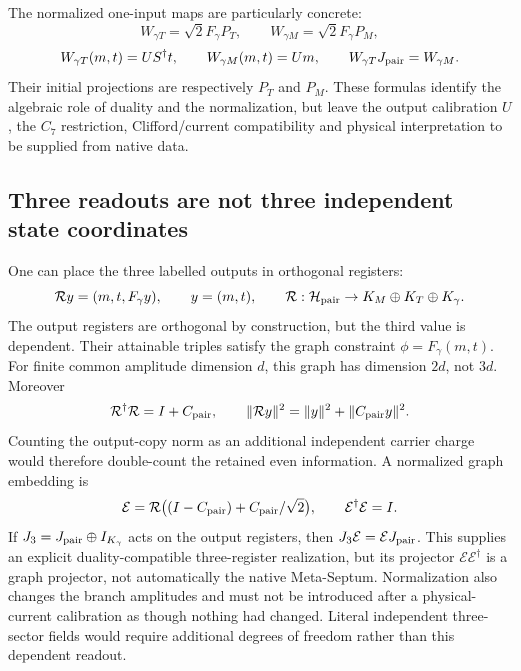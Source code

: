 \documentclass[11pt,a4paper]{article}
\begin{document}
The normalized one-input maps are particularly concrete:
\[
 W_{\gamma T}=\sqrt2 F_\gamma P_T,\qquad
 W_{\gamma M}=\sqrt2 F_\gamma P_M,
\]
\[
 W_{\gamma T}(m,t)=US^\dagger t,\qquad
 W_{\gamma M}(m,t)=Um,\qquad
 W_{\gamma T}J_{\rm pair}=W_{\gamma M}.
\]
Their initial projections are respectively $P_T$ and $P_M$.
These formulas identify the algebraic role of duality and the
normalization, but leave the output calibration $U$, the $C_7$
restriction, Clifford/current compatibility and physical interpretation
to be supplied from native data.

\subsection{Three readouts are not three independent state coordinates}

One can place the three labelled outputs in orthogonal registers:
\[
 \mathcal R y=(m,t,F_\gamma y),\qquad y=(m,t),\qquad
 \mathcal R:\mathcal H_{\rm pair}\to
 K_M\oplus K_T\oplus K_\gamma.
\]
The output registers are orthogonal by construction, but the third
value is dependent. Their attainable triples satisfy the graph
constraint $\phi=F_\gamma(m,t)$. For finite common amplitude
dimension $d$, this graph has dimension $2d$, not $3d$.
Moreover
\[
 \mathcal R^\dagger\mathcal R=I+C_{\rm pair},\qquad
 \|\mathcal R y\|^2=\|y\|^2+\|C_{\rm pair}y\|^2.
\]
Counting the output-copy norm as an additional independent carrier
charge would therefore double-count the retained even information.
A normalized graph embedding is
\[
 \mathcal E=\mathcal R\bigl((I-C_{\rm pair})+
                     C_{\rm pair}/\sqrt2\bigr),
 \qquad \mathcal E^\dagger\mathcal E=I.
\]
If $J_3=J_{\rm pair}\oplus I_{K_\gamma}$ acts on the output
registers, then $J_3\mathcal E=\mathcal E J_{\rm pair}$.
This supplies an explicit duality-compatible three-register
realization, but its projector $\mathcal E\mathcal E^\dagger$
is a graph projector, not automatically the native Meta-Septum.
Normalization also changes the branch amplitudes and must not be
introduced after a physical-current calibration as though nothing
had changed. Literal independent three-sector fields would require
additional degrees of freedom rather than this dependent readout.
\end{document}
